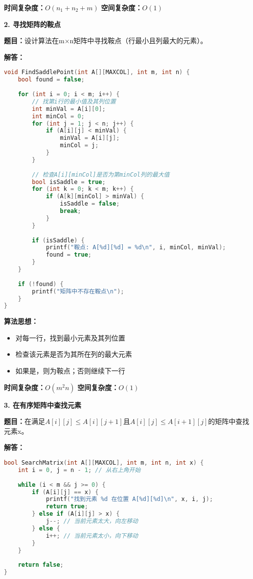 \documentclass[12pt,a4paper]{amsart}
\begin{document}
\textbf{时间复杂度：}$O(n_1 + n_2 + m)$
\textbf{空间复杂度：}$O(1)$

\textbf{2. 寻找矩阵的鞍点}

\textbf{题目：}设计算法在m×n矩阵中寻找鞍点（行最小且列最大的元素）。

\textbf{解答：}
\begin{lstlisting}[language=C++]
void FindSaddlePoint(int A[][MAXCOL], int m, int n) {
    bool found = false;
    
    for (int i = 0; i < m; i++) {
        // 找第i行的最小值及其列位置
        int minVal = A[i][0];
        int minCol = 0;
        for (int j = 1; j < n; j++) {
            if (A[i][j] < minVal) {
                minVal = A[i][j];
                minCol = j;
            }
        }
        
        // 检查A[i][minCol]是否为第minCol列的最大值
        bool isSaddle = true;
        for (int k = 0; k < m; k++) {
            if (A[k][minCol] > minVal) {
                isSaddle = false;
                break;
            }
        }
        
        if (isSaddle) {
            printf("鞍点: A[%d][%d] = %d\n", i, minCol, minVal);
            found = true;
        }
    }
    
    if (!found) {
        printf("矩阵中不存在鞍点\n");
    }
}
\end{lstlisting}

\textbf{算法思想：}
\begin{itemize}
\item 对每一行，找到最小元素及其列位置
\item 检查该元素是否为其所在列的最大元素
\item 如果是，则为鞍点；否则继续下一行
\end{itemize}

\textbf{时间复杂度：}$O(m^2n)$
\textbf{空间复杂度：}$O(1)$

\textbf{3. 在有序矩阵中查找元素}

\textbf{题目：}在满足$A[i][j] \leq A[i][j+1]$且$A[i][j] \leq A[i+1][j]$的矩阵中查找元素x。

\textbf{解答：}
\begin{lstlisting}[language=C++]
bool SearchMatrix(int A[][MAXCOL], int m, int n, int x) {
    int i = 0, j = n - 1; // 从右上角开始
    
    while (i < m && j >= 0) {
        if (A[i][j] == x) {
            printf("找到元素 %d 在位置 A[%d][%d]\n", x, i, j);
            return true;
        } else if (A[i][j] > x) {
            j--; // 当前元素太大，向左移动
        } else {
            i++; // 当前元素太小，向下移动
        }
    }
    
    return false;
}
\end{lstlisting}
\end{document}
